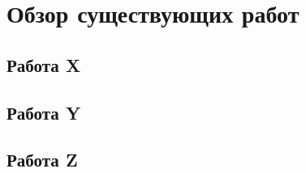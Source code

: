 \chapter{Обзор существующих работ}\label{ch:overview}

\section*{Работа X}
\section*{Работа Y}
\section*{Работа Z}